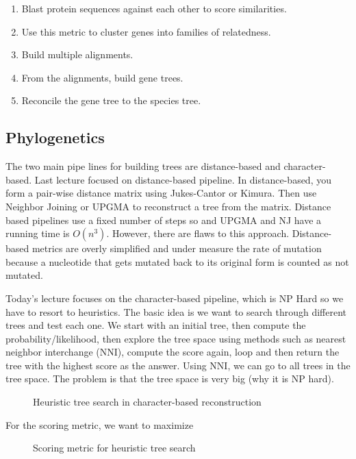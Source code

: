 \begin{enumerate}
\item Blast protein sequences against each other to score similarities.
\item Use this metric to cluster genes into families of relatedness. 
\item Build multiple alignments. 
\item From the alignments, build gene trees. 
\item Reconcile the gene tree to the species tree. 
\end{enumerate} 

\subsection{Phylogenetics}
The two main pipe lines for building trees are distance-based and
character-based. Last lecture focused on distance-based pipeline. In
distance-based, you form a pair-wise distance matrix using
Jukes-Cantor or Kimura. Then use Neighbor Joining or UPGMA to
reconstruct a tree from the matrix. Distance based pipelines use a
fixed number of steps so and UPGMA and NJ have a running time is
$O(n^3)$. However, there are flaws to this approach. Distance-based
metrics are overly simplified and under measure the rate of mutation
because a nucleotide that gets mutated back to its original form is
counted as not mutated.

Today’s lecture focuses on the character-based pipeline, which is NP
Hard so we have to resort to heuristics. The basic idea is we want to
search through different trees and test each one. We start with an
initial tree, then compute the probability/likelihood, then explore
the tree space using methods such as nearest neighbor interchange
(NNI), compute the score again, loop and then return the tree with the
highest score as the answer. Using NNI, we can go to all trees in the
tree space. The problem is that the tree space is very big (why it is
NP hard).

\begin{figure}[ht!]
  \centering
  \caption{Heuristic tree search in character-based reconstruction}
  \label{Fig01_HeuristicTreeSearch}
\end{figure}

\noindent For the scoring metric, we want to maximize

\begin{figure}[ht!]
  \centering
  \caption{Scoring metric for heuristic tree search}
  \label{Fig02_MLScoringStep}
\end{figure}

